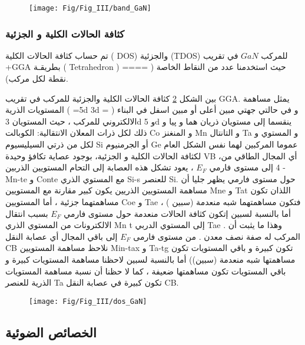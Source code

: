 \begin{figure}[h!]
	\centering
	\texttt{[image: Fig/Fig\_III/band\_GaN]}
	\caption{}
	\label{fig:bandgan}
\end{figure}
\FloatBarrier

\subsubsection{كثافة الحالات الكلية و الجزئية}

تم حساب كثافة الحالات الكلية ( DOS) والجزئية (TDOS) للمركب $ GaN  $  في تقريب +GGA بطريقـة ( Tetrahedron ) حيث استخدمنا عدد من النقاط الخاصة ( ==== نقطة لكل مركب).

بين الشكل \ref{fig:dosgan} كثافة الحالات الكلية والجزئية للمركب في تقريب GGA. يمثل مساهمة المستويات الذرية ( =5d 3d = ) و في حالتي جهتي مبين أعلى أو مبين اسفل في البناء الالكتروني للمركب ، حيث المستويان 3d و 5d ينقسما إلى مستويان ذريان هما و پيا و ذلك لكل ذرات المعلان الانتقالية: الكوبالت Co و المنغنز Mn و التانتال Ta و المستوي و لكل من ذرتي السيليسيوم Si أو الجرمنيوم Ge عموما المركبين لهما نفس الشكل العام لكثافة الحالات الكلية و الجزئية، بوجود عصاية تكافؤ وحيدة VB ،أي المجال الطاقي من - 4 إلى مستوى فارمي $ E_{F} $ ، يعود تشكل هذه العصابة إلى التحام المستويين الذربين Mn-te و Conte مع المستوي الذري Si-s للعنصر Si. حول مستوى فارمي يظهر جليا أن مساهمة المستويين الذريين  يكون كبير مقارنة مع المستويين Mne و Tat اللذان تكون مساهمتهما جزئية ، أما المستويين Coe و Tae فتكون مساهمتهما شبه منعدمة (سبين ) ، أما بالنسبة لسبين إتكون كثافة الحالات منعدمة حول مستوى فارمي $ E_{F} $ بسبب انتقال الالكترونات من المستوي الذري Mn t إلى المستوي الدربي Tae . وهذا ما يثبت أن المركب له صفة نصف معدن . من مستوى فارمی $ E_{F} $ إلى باقي المجال أي عصابة النقل CB نلاحظ مساهمة المستويين Min-tax و Ta-tg تكون كبيرة و باقي المستويات تكون مساهمتها شبه منعدمة (سبين)) أما بالنسبة لسبين لاحظنا مساهمة المستويات كبيرة و باقي المستويات تكون مساهمتها ضعيفة ، كما لا حظنا أن نسبة مساهمة المستويات الذرية للعنصر Ta تكون كبيرة في عصابة النقل CB.

\begin{figure}[h!]
	\centering
	\texttt{[image: Fig/Fig\_III/dos\_GaN]}
	\caption{}
	\label{fig:dosgan}
\end{figure}
\FloatBarrier

\subsection{الخصائص الضوئية}

